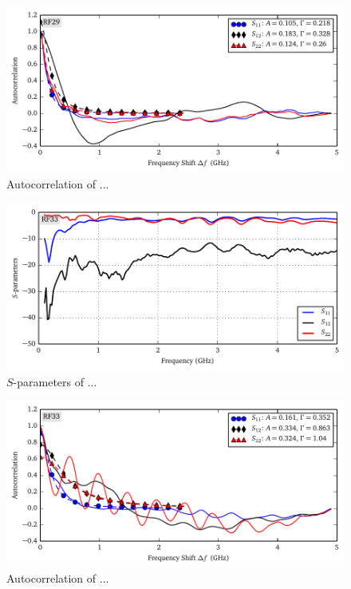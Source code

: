 \begin{figure}
 \centering
 \includegraphics{figs/active/RF29-autoCorrelation.pdf}
 \caption{Autocorrelation of ...}
\end{figure}

\begin{figure}
 \centering
 \includegraphics{figs/active/RF33-sParameters.pdf}
 \caption{$S$-parameters of ...}
\end{figure}

\begin{figure}
 \centering
 \includegraphics{figs/active/RF33-autoCorrelation.pdf}
 \caption{Autocorrelation of ...}
\end{figure}

